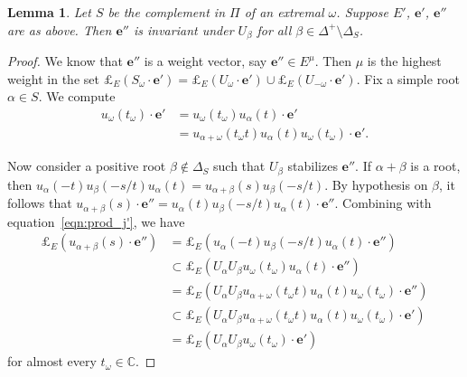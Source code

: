 \documentclass{amsart}
\theoremstyle{plain}
\newtheorem{lemma}[theorem]{Lemma}
\theoremstyle{definition}
\theoremstyle{remark}
\newcommand{\Vect}[1]{\mathbold{#1}}
\begin{document}
\begin{lemma}\label{lem:hwvLiesInLongChain}
Let $S$ be the complement in $\Pi$ of an extremal $\omega$.
Suppose $E'$, $\Vect{e}'$, $\Vect{e}''$ are as above. Then
$\Vect{e}''$ is invariant under $U_{\beta}$ for all $\beta \in
\Delta^{+} \setminus \Delta_{S}$.
\end{lemma}
\begin{proof}
We know that $\Vect{e}''$ is a weight vector, say $\Vect{e}'' \in
E^{\mu}$. Then $\mu$ is the highest weight in the set $\pounds_{E}
(S_{\omega} \cdot \Vect{e}') = \pounds_{E} (U_{\omega} \cdot
\Vect{e}') \cup \pounds_{E} (U_{-\omega} \cdot
\Vect{e}')$. Fix a simple root $\alpha \in S$. We compute
\begin{equation}\label{eqn:prod_j'}
\begin{split}
u_{\omega}(t_{\omega}) \cdot \Vect{e}'
 &= u_{\omega}(t_{\omega}) u_{\alpha}(t)
\cdot
\Vect{e}'\\
&= u_{\alpha + \omega}(t_{\omega} t) u_{\alpha}(t)
u_{\omega}(t_{\omega}) \cdot \Vect{e}'.
\end{split}
\end{equation}

Now consider a positive root $\beta \notin \Delta_{S}$ such that
$U_{\beta}$ stabilizes $\Vect{e}''$. If $\alpha + \beta$ is a
root, then $u_{\alpha}(-t) u_{\beta}(-s/t) u_{\alpha}(t) =
u_{\alpha + \beta}(s)u_{\beta}(-s/t)$. By hypothesis on $\beta$,
it follows that $u_{\alpha + \beta}(s) \cdot \Vect{e}'' =
u_{\alpha}(t) u_{\beta}(-s/t)u_{\alpha}(t) \cdot \Vect{e}''$.
Combining with equation~\eqref{eqn:prod_j'}, we have
\begin{equation*}
\begin{split}
\pounds_{E} (u_{\alpha + \beta}(s) \cdot \Vect{e}'') &=
\pounds_{E}(u_{\alpha}(-t) u_{\beta}(-s/t) u_{\alpha}(t) \cdot
\Vect{e}'')\\
&\subset \pounds_{E}(U_{\alpha} U_{\beta} u_{\omega}(t_{\omega})
u_{\alpha}(t) \cdot \Vect{e}'')\\
&= \pounds_{E}(U_{\alpha} U_{\beta} u_{\alpha + \omega}(t_{\omega}
t) u_{\alpha}(t)
u_{\omega}(t_{\omega}) \cdot \Vect{e}'')\\
&\subset \pounds_{E}(U_{\alpha} U_{\beta} u_{\alpha +
\omega}(t_{\omega} t) u_{\alpha}(t)
u_{\omega}(t_{\omega}) \cdot \Vect{e}')\\
&= \pounds_{E}(U_{\alpha} U_{\beta} u_{\omega}(t_{\omega}) \cdot
\Vect{e}')
\end{split}
\end{equation*}
for almost every $t_{\omega} \in \mathbb{C}$.


\end{proof}
\end{document}
